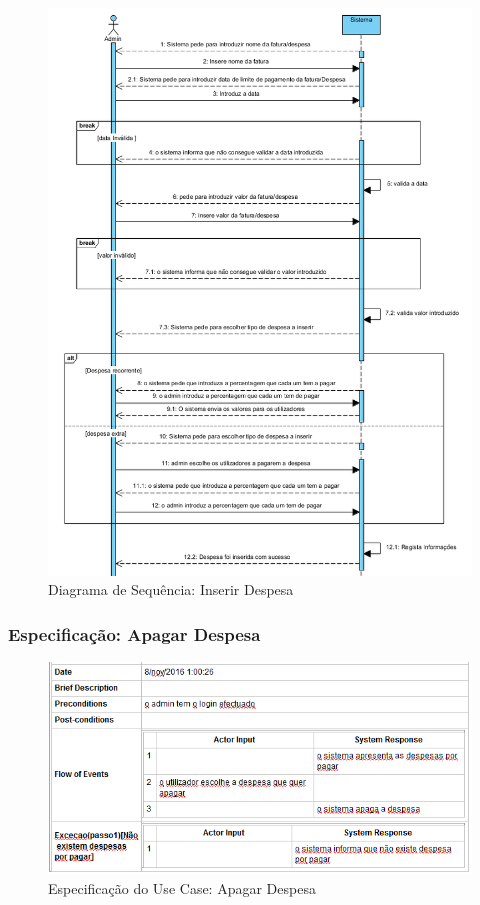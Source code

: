 \begin{figure}[htb!]
	\centering
	\includegraphics[scale=0.5]{imagens/DiagramaSeq/InserirDespesa}  
	\caption{Diagrama de Sequência: Inserir Despesa}  
\end{figure}

\newpage

\subsubsection{Especificação: Apagar Despesa}

\begin{figure}[htb!]
	\centering
	\includegraphics[scale=0.6]{imagens/Especificacoes/apagardespesa}  
	\caption{Especificação do Use Case: Apagar Despesa}  
\end{figure}


